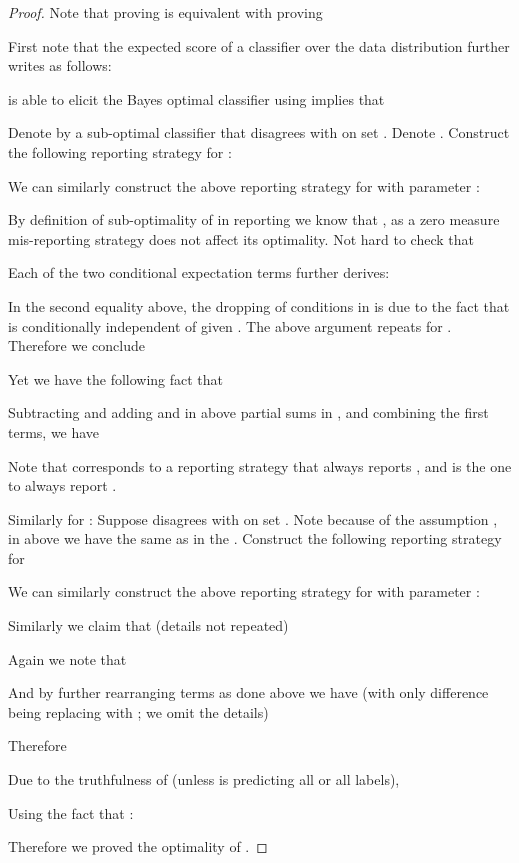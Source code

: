 \begin{proof}
Note that proving  is equivalent with proving  

First note that the expected score of a classifier over the data distribution further writes as follows:

 is able to elicit the Bayes optimal classifier  using  implies that 



Denote by  a sub-optimal classifier that disagrees with  on set . Denote . Construct the following reporting strategy for : 
  
 We can similarly construct the above reporting strategy for   with parameter :
   
 By definition of sub-optimality of  in reporting we know that
, as a zero measure mis-reporting strategy does not affect its optimality. Not hard to check that 
 
  Each of the two conditional expectation terms further derives:
 
In the second equality above, the dropping of conditions  in  is due to the fact that  is conditionally independent of  given . The above argument repeats for . Therefore we conclude
 
 
 Yet we have the following fact that

  Subtracting and adding  and  in above partial sums in , and combining the first  terms, we have 
  
Note that  corresponds to a reporting strategy that always reports , and  is the one to always report . 




 Similarly for : Suppose  disagrees with  on set . Note  
 because of the assumption 
, in above we have the same  as in the . Construct the following reporting strategy for 
  
 We can similarly construct the above reporting strategy for   with parameter :
   
 Similarly we claim that (details not repeated)
  
Again we note that
  
 And by further rearranging terms as done above we have (with only difference being replacing  with ; we omit the details)

 Therefore 
 
  Due to the truthfulness of  (unless  is predicting all  or all  labels), 
  
Using the fact that :

Therefore we proved the optimality of .



\end{proof}




